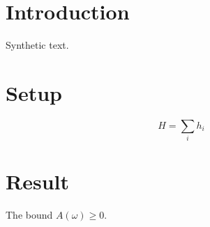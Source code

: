 \documentclass{article}
\begin{document}
\setcounter{page}{25}
\section{Introduction}
Synthetic text.
\section{Setup}\label{sec:setup}
\begin{equation}\label{eq:setup}
H = \sum_i h_i
\end{equation}
\section{Result}\label{sec:result}
The bound $A(\omega) \ge 0$.
\end{document}
